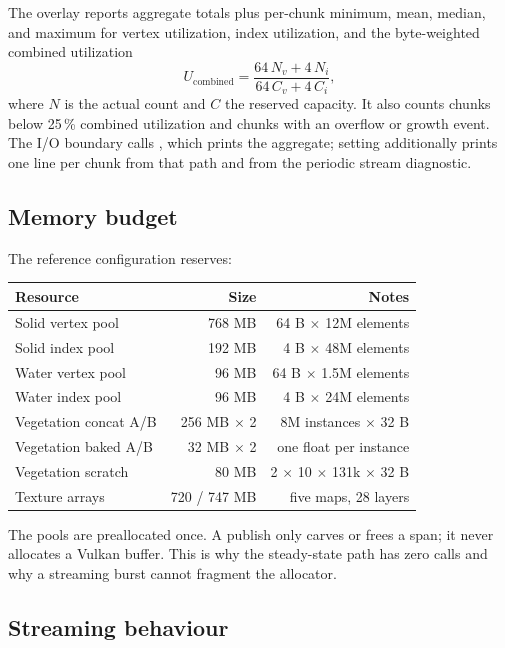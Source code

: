 The overlay reports aggregate totals plus per-chunk minimum, mean, median,
and maximum for vertex utilization, index utilization, and the byte-weighted
combined utilization
\begin{equation}
  U_{\text{combined}} =
  \frac{64\,N_v + 4\,N_i}{64\,C_v + 4\,C_i},
\end{equation}
where $N$ is the actual count and $C$ the reserved capacity.  It also counts
chunks below 25\,\% combined utilization and chunks with an overflow or
growth event.  The I/O boundary calls , which
prints the aggregate; setting  additionally
prints one line per chunk from that path and from the periodic stream
diagnostic.

\subsection{Memory budget}

The reference configuration reserves:
\begin{center}
\begin{tabular}{@{}lrr@{}}
\toprule
Resource & Size & Notes\\
\midrule
Solid vertex pool & 768 MB & 64 B $\times$ 12M elements\\
Solid index pool & 192 MB & 4 B $\times$ 48M elements\\
Water vertex pool & 96 MB & 64 B $\times$ 1.5M elements\\
Water index pool & 96 MB & 4 B $\times$ 24M elements\\
Vegetation concat A/B & 256 MB $\times$ 2 & 8M instances $\times$ 32 B\\
Vegetation baked A/B & 32 MB $\times$ 2 & one float per instance\\
Vegetation scratch & 80 MB & 2 $\times$ 10 $\times$ 131k $\times$ 32 B\\
Texture arrays & 720 / 747 MB & five maps, 28 layers\\
\bottomrule
\end{tabular}
\end{center}

The pools are preallocated once.  A publish only carves or frees a span;
it never allocates a Vulkan buffer.  This is why the steady-state path has
zero  calls and why a streaming burst cannot
fragment the allocator.

\subsection{Streaming behaviour}

